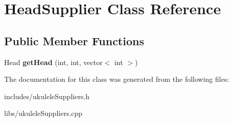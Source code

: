 \hypertarget{class_head_supplier}{}\section{Head\+Supplier Class Reference}
\label{class_head_supplier}
\subsection*{Public Member Functions}
\begin{DoxyCompactItemize}
\item 
\hypertarget{class_head_supplier_af2af6c3ebf0c5a394158aff9494db175}{}\label{class_head_supplier_af2af6c3ebf0c5a394158aff9494db175} 
Head {\bfseries get\+Head} (int, int, vector$<$ int $>$)
\end{DoxyCompactItemize}


The documentation for this class was generated from the following files\+:\begin{DoxyCompactItemize}
\item 
includes/ukulele\+Suppliers.\+h\item 
libs/ukulele\+Suppliers.\+cpp\end{DoxyCompactItemize}
